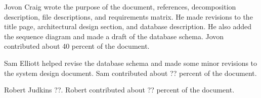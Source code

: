 \documentclass{article}
\begin{document}
Jovon Craig wrote the purpose of the document, references, decomposition description, file descriptions, and requirements matrix. He made revisions to the title page, architectural design section, and database description. He also added the sequence diagram and made a draft of the database schema. Jovon contributed about 40 percent of the document.

Sam Elliott helped revise the database schema and made some minor revisions to the system design document. Sam contributed about ?? percent of the document.

Robert Judkins ??. Robert contributed about ?? percent of the document.
\end{document}
